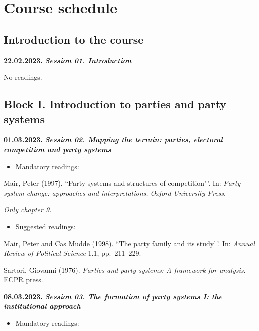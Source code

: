\documentclass[
  12pt,
]{article}
\providecommand{\tightlist}{%
  \setlength{\itemsep}{0pt}\setlength{\parskip}{0pt}}
\begin{document}
\hypertarget{course-schedule}{%
\section{Course schedule}\label{course-schedule}}

\hypertarget{introduction-to-the-course}{%
\subsection{Introduction to the
course}\label{introduction-to-the-course}}

\textbf{22.02.2023.} \textbf{\emph{Session 01. Introduction}}

No readings.

\hypertarget{block-i.-introduction-to-parties-and-party-systems}{%
\subsection{Block I. Introduction to parties and party
systems}\label{block-i.-introduction-to-parties-and-party-systems}}

\textbf{01.03.2023.} \textbf{\emph{Session 02. Mapping the terrain:
parties, electoral competition and party systems}}

\begin{itemize}
\tightlist
\item
  Mandatory readings:
\end{itemize}

Mair, Peter (1997). ``Party systems and structures of competition'\,'.
In:
\emph{Party system change: approaches and interpretations. Oxford University Press}.

\emph{Only chapter 9.}

\begin{itemize}
\tightlist
\item
  Suggested readings:
\end{itemize}

Mair, Peter and Cas Mudde (1998). ``The party family and its study'\,'.
In: \emph{Annual Review of Political Science} 1.1, pp.~211--229.

Sartori, Giovanni (1976).
\emph{Parties and party systems: A framework for analysis}. ECPR press.

\textbf{08.03.2023.} \textbf{\emph{Session 03. The formation of party
systems I: the institutional approach}}

\begin{itemize}
\tightlist
\item
  Mandatory readings:
\end{itemize}
\end{document}
